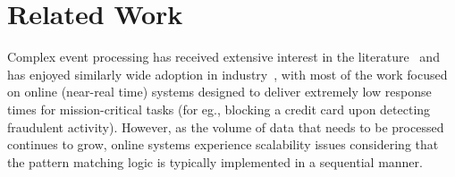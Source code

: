 \section{Related Work}
\label{sec:rel_work}

Complex event processing has received extensive interest in the 
literature~\cite{SASE:2008,Akdere:2008,Brenna:2007,Cadonna:2011,Cadonna:2012,
	Demers:2007,Johnson:2007,Leghari:2015,Li:2007,Sadri:2004,SASE:2014,
	Raychev:2015} and 
has enjoyed similarly wide adoption in 
industry~\cite{esper_epl,oracle_mr,aster_npath,Carasso:2012},
with most of the work focused on online (near-real time) systems designed to 
deliver extremely low response times for mission-critical tasks (for eg., 
blocking a credit card upon detecting fraudulent activity). 
However, as the volume of data that needs to be processed continues to grow, 
online systems experience scalability issues considering that the 
pattern matching logic is typically implemented in a sequential manner.  







